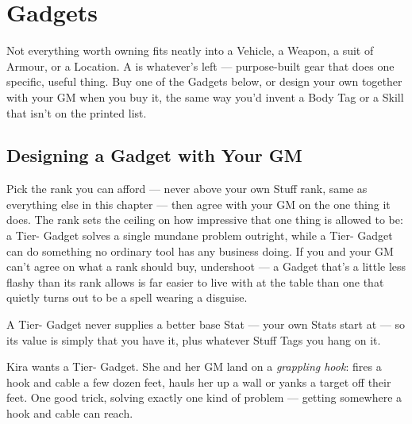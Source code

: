 \section{Gadgets}
Not everything worth owning fits neatly into a Vehicle, a Weapon, a suit
of Armour, or a Location. A  is whatever's left ---
purpose-built gear that does one specific, useful thing. Buy one of the
Gadgets below, or design your own together with your GM when
you buy it, the same way you'd invent a Body Tag or a Skill that isn't
on the printed list.

\subsection*{Designing a Gadget with Your GM}
Pick the rank you can afford --- never above your own Stuff rank, same
as everything else in this chapter --- then agree with your GM on the
one thing it does. The rank sets the ceiling on how impressive that one
thing is allowed to be: a Tier- Gadget solves a single mundane
problem outright, while a Tier- Gadget can do something no
ordinary tool has any business doing. If you and your GM can't agree on
what a rank should buy, undershoot --- a Gadget that's a little less
flashy than its rank allows is far easier to live with at the table than
one that quietly turns out to be a spell wearing a disguise.

A Tier- Gadget never supplies a better base Stat --- your own
Stats start at  --- so its value is simply that you have it,
plus whatever Stuff Tags you hang on it.

\begin{example}
Kira wants a Tier- Gadget. She and her GM land on a
\emph{grappling hook}: fires a hook and cable a few dozen feet, hauls her
up a wall or yanks a target off their feet. One good trick, solving
exactly one kind of problem --- getting somewhere a hook and cable can
reach.
\end{example}

